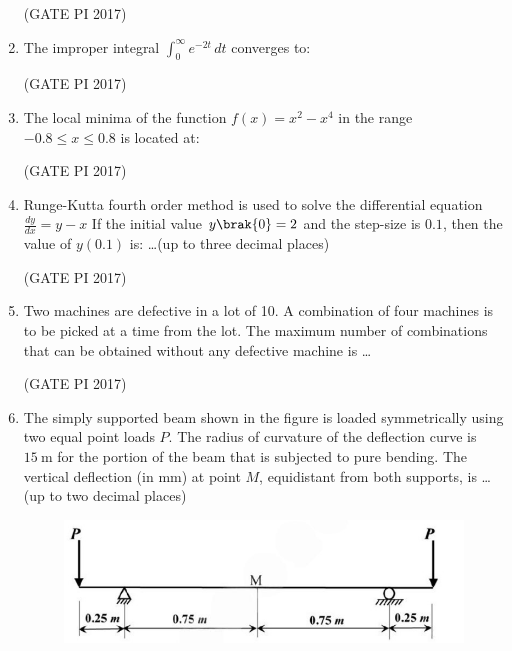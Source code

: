 \documentclass[journal,12pt,onecolumn]{IEEEtran}
\theoremstyle{remark}
\begin{document}
\begin{enumerate}
\hfill (GATE PI 2017)

\item The improper integral $\int_{0}^{\infty} e^{-2t} \, dt$ converges to:
\begin{enumerate}
\end{enumerate}
\hfill (GATE PI 2017)

\item The local minima of the function $f(x) = x^{2} - x^{4}$ in the range $-0.8 \leq x \leq 0.8$ is located at:
\begin{enumerate}
\end{enumerate}
\hfill (GATE PI 2017)

\item Runge\--Kutta fourth order method is used to solve the differential equation
$
\frac{dy}{dx} = y - x
$
If the initial value $y\brak{0} = 2$ and the step-size is $0.1$, then the value of $y(0.1)$ is:  
\dots (up to three decimal places)  

\hfill (GATE PI 2017)

\item Two machines are defective in a lot of 10. A combination of four machines is to be picked at a time from the lot.  
The maximum number of combinations that can be obtained without any defective machine is \dots
  
\hfill (GATE PI 2017)

\item The simply supported beam shown in the figure is loaded symmetrically using two equal point loads $P$.  
The radius of curvature of the deflection curve is $15 \ \text{m}$ for the portion of the beam that is subjected to pure bending.  
The vertical deflection (in mm) at point $M$, equidistant from both supports, is \dots (up to two decimal places)

\begin{figure}[H]
    \centering
    \includegraphics[width=0.5\columnwidth]{fig4.png}
    \caption{}
    \label{fig:placeholder}
\end{figure}


\end{enumerate}
\end{document}
